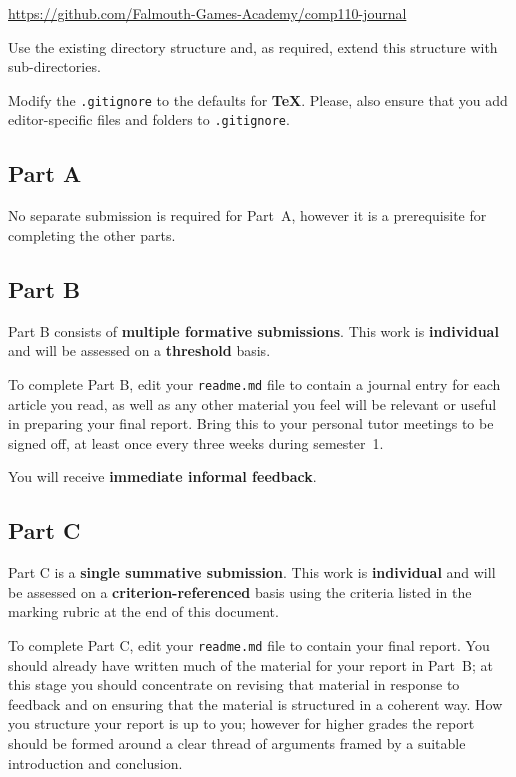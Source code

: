 \documentclass{../fal_assignment}
\begin{document}
\indent \url{https://github.com/Falmouth-Games-Academy/comp110-journal}

Use the existing directory structure and, as required, extend this structure with sub-directories.

Modify the \texttt{.gitignore} to the defaults for \textbf{TeX}. Please, also ensure that you add editor-specific files and folders to \texttt{.gitignore}. 

\subsection*{Part A}

No separate submission is required for Part~A, however it is a prerequisite for completing the other parts.

\subsection*{Part B}

Part B consists of \textbf{multiple formative submissions}. This work is \textbf{individual} and will be assessed on a \textbf{threshold} basis.

To complete Part B, edit your \texttt{readme.md} file to contain a journal entry for each article you read,
as well as any other material you feel will be relevant or useful in preparing your final report.
Bring this to your personal tutor meetings to be signed off, at least once every three weeks during semester~1.

You will receive \textbf{immediate informal feedback}.

\subsection*{Part C}

Part C is a \textbf{single summative submission}. This work is \textbf{individual} and will be assessed on a \textbf{criterion-referenced} basis
using the criteria listed in the marking rubric at the end of this document.

To complete Part C, edit your \texttt{readme.md} file to contain your final report.
You should already have written much of the material for your report in Part~B;
at this stage you should concentrate on revising that material in response to feedback
and on ensuring that the material is structured in a coherent way.
How you structure your report is up to you;
however for higher grades the report should be formed around a clear thread of arguments framed by a suitable introduction and conclusion.
\end{document}
